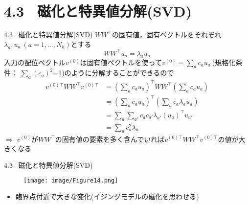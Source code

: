 \documentclass[dvipdfmx,8pt]{beamer}
\begin{document}
\section{4.3 \ 磁化と特異値分解(SVD)}
\begin{frame}[t]{4.3 \ 磁化と特異値分解(SVD)}
  $WW^{\top}$の固有値，固有ベクトルをそれぞれ$\lambda_a , u_a \ (a=1,\dots,N_h)$とする
  \begin{equation*}
    WW^{\top}u_a = \lambda_a u_a
  \end{equation*}
  入力の配位ベクトル$v^{(0)}$は固有値ベクトルを使って$v^{(0)}=\sum_{a}c_a u_a \ $(規格化条件： $\sum_{a}(c_a)^2$=1)のように分解することができるので
  \begin{align*}
    v^{(0)\top}WW^{\top}v^{(0)\top}
    &= \left(\sum_a c_a u_a\right)^{\top}WW^{\top}\left(\sum_a c_a u_a\right)\\
    &= \left(\sum_a c_a u_a\right)^{\top}\left(\sum_a c_a \lambda_a u_a\right)\\
    &= \sum_a \sum_{a'} c_a c_{a'} \lambda_{a'} (u_a)^{\top}u_{a'}\\
    &= \sum_a c_a^2 \lambda_a
  \end{align*}
  $\Rightarrow$ $v^{(0)}$が$WW^{\top}$の固有値の要素を多く含んでいれば$v^{(0)\top}WW^{\top}v^{(0)\top}$の値が大きくなる
\end{frame}

\begin{frame}[t]{4.3 \ 磁化と特異値分解(SVD)}
  \begin{figure}
    \begin{center}
      \texttt{[image: image/Figure14.png]}
    \end{center}
  \end{figure}
  \begin{itemize}
    \item 臨界点付近で大きな変化(イジングモデルの磁化を思わせる)
  \end{itemize}
\end{frame}
\end{document}
